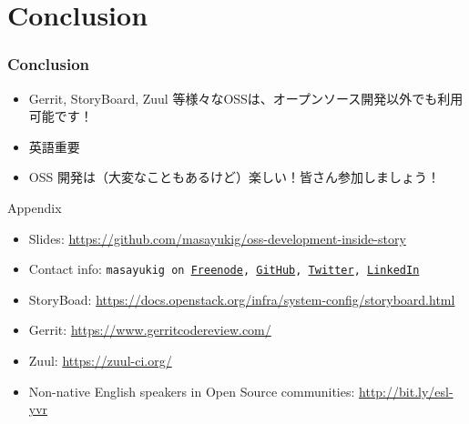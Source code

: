 \documentclass[aspectratio=169,11pt,hyperref={colorlinks=true}]{beamer}
\begin{document}
\section{Conclusion}
\begin{frame}
  \frametitle{Conclusion}
  \begin{itemize}
    \item Gerrit, StoryBoard, Zuul 等様々なOSSは、オープンソース開発以外でも利用可能です！
    \item 英語重要
    \item OSS 開発は（大変なこともあるけど）楽しい！皆さん参加しましょう！
  \end{itemize}
  Appendix
  \begin{itemize}
      \item Slides: \url{https://github.com/masayukig/oss-development-inside-story}
      \item Contact info: \texttt{masayukig on
        \href{https://freenode.net/}{Freenode},
        \href{https://github.com/masayukig}{GitHub},
        \href{https://twitter.com/masayukig}{Twitter},
        \href{https://www.linkedin.com/in/masayukig/}{LinkedIn}}
      \item StoryBoad: \url{https://docs.openstack.org/infra/system-config/storyboard.html}
      \item Gerrit: \url{https://www.gerritcodereview.com/}
      \item Zuul: \url{https://zuul-ci.org/}
      \item Non-native English speakers in Open Source communities: \url{http://bit.ly/esl-yvr}
  \end{itemize}
\end{frame}
\end{document}
